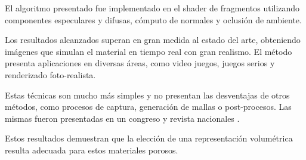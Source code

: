 El algoritmo presentado fue implementado en el shader de fragmentos utilizando componentes especulares y difusas, cómputo de normales y oclusión de ambiente.

Los resultados alcanzados superan en gran medida al estado del arte, obteniendo imágenes que simulan el material en tiempo real con gran realismo.
El método presenta aplicaciones en diversas áreas, como video juegos, juegos serios \cite{Susi2007} y renderizado foto-realista.

Estas técnicas son mucho más simples y no presentan las desventajas de otros métodos, como procesos de captura, generación de mallas o post-procesos.
Las mismas fueron presentadas en un congreso y revista nacionales \cite{Baravalle2014}.

Estos resultados demuestran que la elección de una representación volumétrica resulta adecuada para estos materiales porosos.



